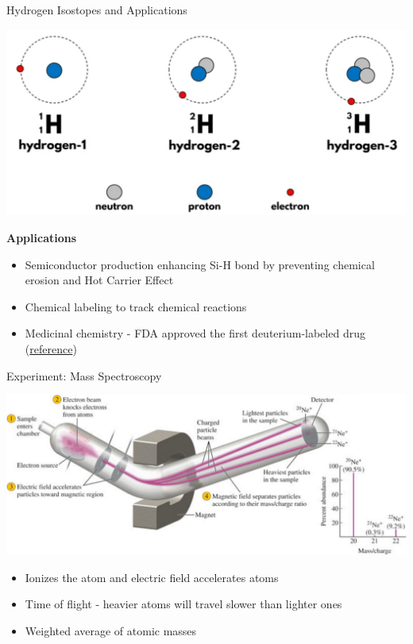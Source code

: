 \documentclass[11pt]{beamer}
\begin{document}
\begin{frame}{Hydrogen Isostopes and Applications}
  \begin{center}
    \includegraphics[width=0.75\linewidth]{hydro_iso}
  \end{center}

  \textbf{Applications}
  
  \begin{itemize}
  \item Semiconductor production enhancing Si-H bond by preventing
    chemical erosion and Hot Carrier Effect
  \item Chemical labeling to track chemical reactions
  \item Medicinal chemistry - FDA approved the first deuterium-labeled
    drug (\href{https://pubs.acs.org/doi/10.1021/acs.jmedchem.8b01808}{reference})
  \end{itemize}
\end{frame}

\begin{frame}{Experiment: Mass Spectroscopy}
  \begin{center}
    \includegraphics[width=\linewidth]{mass_spect}
  \end{center}

  \begin{itemize}
  \item Ionizes the atom and electric field accelerates atoms
  \item Time of flight - heavier atoms will travel slower
    than lighter ones
  \item Weighted average of atomic masses
  \end{itemize}  
\end{frame}
\end{document}
